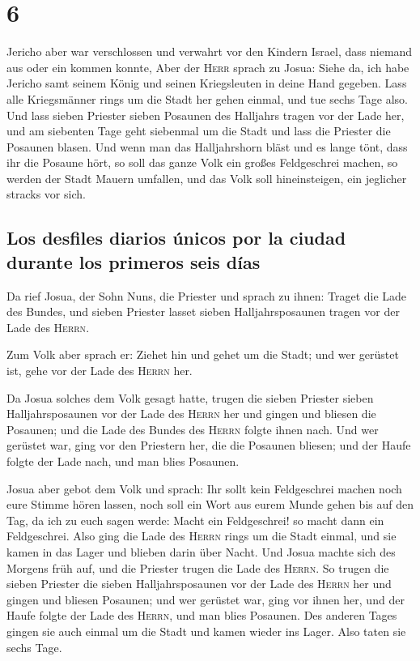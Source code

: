 \hypertarget{section-5}{%
\section{6}\label{section-5}}

 Jericho aber war verschlossen und verwahrt vor den
Kindern Israel, dass niemand aus oder ein kommen konnte, 
Aber der \textsc{Herr} sprach zu Josua: Siehe da, ich habe Jericho samt
seinem König und seinen Kriegsleuten in deine Hand gegeben.
 Lass alle Kriegsmänner rings um die Stadt her gehen
einmal, und tue sechs Tage also.  Und lass sieben Priester
sieben Posaunen des Halljahrs tragen vor der Lade her, und am siebenten
Tage geht siebenmal um die Stadt und lass die Priester die Posaunen
blasen.  Und wenn man das Halljahrshorn bläst und es lange
tönt, dass ihr die Posaune hört, so soll das ganze Volk ein großes
Feldgeschrei machen, so werden der Stadt Mauern umfallen, und das Volk
soll hineinsteigen, ein jeglicher stracks vor sich.

\hypertarget{los-desfiles-diarios-uxfanicos-por-la-ciudad-durante-los-primeros-seis-duxedas}{%
\subsection{Los desfiles diarios únicos por la ciudad durante los
primeros seis
días}\label{los-desfiles-diarios-uxfanicos-por-la-ciudad-durante-los-primeros-seis-duxedas}}

 Da rief Josua, der Sohn Nuns, die Priester und sprach zu
ihnen: Traget die Lade des Bundes, und sieben Priester lasset sieben
Halljahrsposaunen tragen vor der Lade des \textsc{Herrn}.

 Zum Volk aber sprach er: Ziehet hin und gehet um die
Stadt; und wer gerüstet ist, gehe vor der Lade des \textsc{Herrn} her.

 Da Josua solches dem Volk gesagt hatte, trugen die sieben
Priester sieben Halljahrsposaunen vor der Lade des \textsc{Herrn} her
und gingen und bliesen die Posaunen; und die Lade des Bundes des
\textsc{Herrn} folgte ihnen nach.  Und wer gerüstet war,
ging vor den Priestern her, die die Posaunen bliesen; und der Haufe
folgte der Lade nach, und man blies Posaunen.

 Josua aber gebot dem Volk und sprach: Ihr sollt kein
Feldgeschrei machen noch eure Stimme hören lassen, noch soll ein Wort
aus eurem Munde gehen bis auf den Tag, da ich zu euch sagen werde: Macht
ein Feldgeschrei! so macht dann ein Feldgeschrei.  Also
ging die Lade des \textsc{Herrn} rings um die Stadt einmal, und sie
kamen in das Lager und blieben darin über Nacht.  Und
Josua machte sich des Morgens früh auf, und die Priester trugen die Lade
des \textsc{Herrn}.  So trugen die sieben Priester die
sieben Halljahrsposaunen vor der Lade des \textsc{Herrn} her und gingen
und bliesen Posaunen; und wer gerüstet war, ging vor ihnen her, und der
Haufe folgte der Lade des \textsc{Herrn}, und man blies Posaunen.
 Des anderen Tages gingen sie auch einmal um die Stadt
und kamen wieder ins Lager. Also taten sie sechs Tage.

